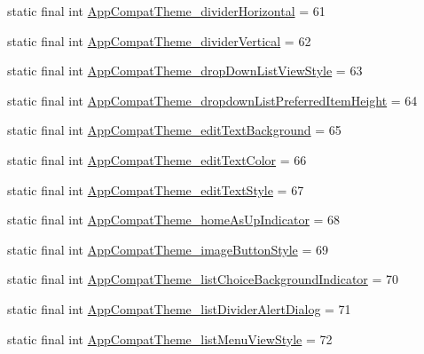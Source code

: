 \begin{DoxyCompactItemize}
\item 
static final int \mbox{\hyperlink{classcom_1_1synnapps_1_1carouselview_1_1_r_1_1styleable_aa83baa436a9d1a2fcdc85535f1e139c4}{App\+Compat\+Theme\+\_\+divider\+Horizontal}} = 61
\item 
static final int \mbox{\hyperlink{classcom_1_1synnapps_1_1carouselview_1_1_r_1_1styleable_a4f1d2f81fb0f4ce5ff08890116ee0826}{App\+Compat\+Theme\+\_\+divider\+Vertical}} = 62
\item 
static final int \mbox{\hyperlink{classcom_1_1synnapps_1_1carouselview_1_1_r_1_1styleable_a8c9eb53ff41ead5c9a45ce24dfecf631}{App\+Compat\+Theme\+\_\+drop\+Down\+List\+View\+Style}} = 63
\item 
static final int \mbox{\hyperlink{classcom_1_1synnapps_1_1carouselview_1_1_r_1_1styleable_af14d7da8e18780de8e27fb6f8198af40}{App\+Compat\+Theme\+\_\+dropdown\+List\+Preferred\+Item\+Height}} = 64
\item 
static final int \mbox{\hyperlink{classcom_1_1synnapps_1_1carouselview_1_1_r_1_1styleable_a8ca305bf6db0854e7d3a046e572290cb}{App\+Compat\+Theme\+\_\+edit\+Text\+Background}} = 65
\item 
static final int \mbox{\hyperlink{classcom_1_1synnapps_1_1carouselview_1_1_r_1_1styleable_adf6cbb5ac6a071a11ea22f26e916bd24}{App\+Compat\+Theme\+\_\+edit\+Text\+Color}} = 66
\item 
static final int \mbox{\hyperlink{classcom_1_1synnapps_1_1carouselview_1_1_r_1_1styleable_a8a49f0d2956cdaac5876d07e08456762}{App\+Compat\+Theme\+\_\+edit\+Text\+Style}} = 67
\item 
static final int \mbox{\hyperlink{classcom_1_1synnapps_1_1carouselview_1_1_r_1_1styleable_a9b019600f513aeb36f31f1da8df88a89}{App\+Compat\+Theme\+\_\+home\+As\+Up\+Indicator}} = 68
\item 
static final int \mbox{\hyperlink{classcom_1_1synnapps_1_1carouselview_1_1_r_1_1styleable_a184571356dca3170c93300828ad8ff21}{App\+Compat\+Theme\+\_\+image\+Button\+Style}} = 69
\item 
static final int \mbox{\hyperlink{classcom_1_1synnapps_1_1carouselview_1_1_r_1_1styleable_a04e098d7c621e0d08e77b7ac4e6027bc}{App\+Compat\+Theme\+\_\+list\+Choice\+Background\+Indicator}} = 70
\item 
static final int \mbox{\hyperlink{classcom_1_1synnapps_1_1carouselview_1_1_r_1_1styleable_ad158a52d0727b09e7a2b26547dfc0ff7}{App\+Compat\+Theme\+\_\+list\+Divider\+Alert\+Dialog}} = 71
\item 
static final int \mbox{\hyperlink{classcom_1_1synnapps_1_1carouselview_1_1_r_1_1styleable_a8f19bb231fb0f0fed5f82cb0be0881f3}{App\+Compat\+Theme\+\_\+list\+Menu\+View\+Style}} = 72

\end{DoxyCompactItemize}
